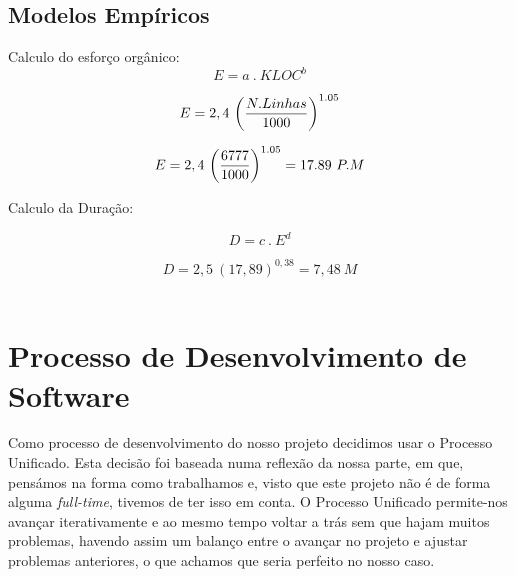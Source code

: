 \documentclass[12pt, a4paper, twoside]{report} %
\begin{document}


\subsection{Modelos Empíricos}

Calculo do esforço orgânico:
\\

\begin{equation}
E = a \ . \ KLOC ^ b
\end{equation}

\begin{equation} 
E = 2,4 \ \bigg({N.Linhas \over 1000}\bigg)^{1.05}
\end{equation}

\begin{equation}
{E = 2,4 \ \bigg({6777 \over 1000}\bigg) ^ {1.05}}
= 17.89 \ P.M
\end{equation}

Calculo da Duração:

\begin{equation}
D = c \ . \ E^d
\end{equation}

\begin{equation}
D = 2,5 \ (17,89)^{0,38}= 7,48\ M
\end{equation}
\\
\section{Processo de Desenvolvimento de Software}

Como processo de desenvolvimento do nosso projeto decidimos usar o Processo Unificado.
Esta decisão foi baseada numa reflexão da nossa parte, em que, pensámos na forma como trabalhamos e, visto que este projeto não é de forma alguma \textit{full-time}, tivemos de ter isso em conta. O Processo Unificado permite-nos avançar iterativamente e ao mesmo tempo voltar a trás sem que hajam muitos problemas, havendo assim um balanço entre o avançar no projeto e ajustar problemas anteriores, o que achamos que seria perfeito no nosso caso.
\\
\end{document}
